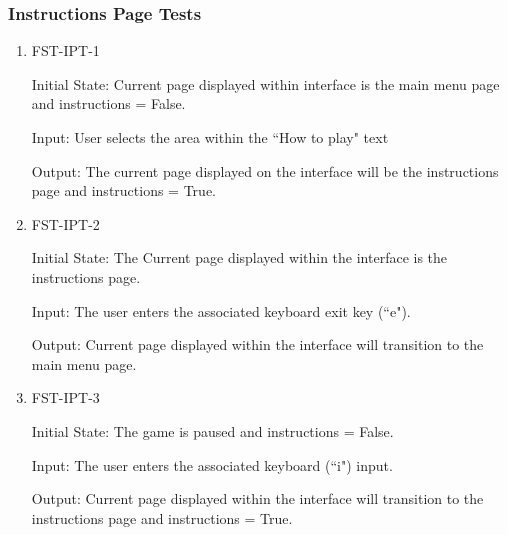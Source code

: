 \documentclass[12pt, titlepage]{article}
\begin{document}





\subsubsection{Instructions Page Tests}

\begin{enumerate}

\item{FST-IPT-1\\}
					
Initial State: Current page displayed within interface is the main menu page and instructions = False.
					
Input: User selects the area within the ``How to play" text
					
Output: The current page displayed on the interface will be the instructions page and instructions = True.
					
\item{FST-IPT-2\\}
					
Initial State: The Current page displayed within the interface is the instructions page.
					
Input: The user enters the associated keyboard exit key (``e").
					
Output: Current page displayed within the interface will transition to the main menu page.
					

\item{FST-IPT-3\\}
					
Initial State:  The game is paused and instructions = False.
					
Input: The user enters the associated keyboard (``i") input.
					
Output: Current page displayed within the interface will transition to the instructions page and instructions = True.



\end{enumerate}

\end{document}
